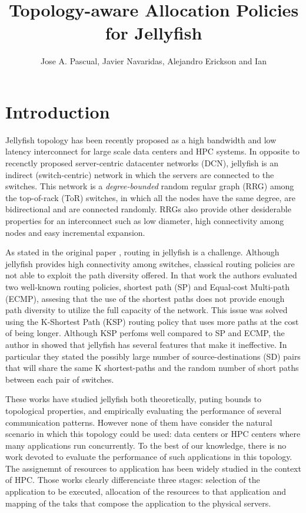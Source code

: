 \documentclass{sig-alternate}
\title{Topology-aware Allocation Policies for Jellyfish }
\author{Jose A. Pascual, Javier Navaridas, Alejandro Erickson and Ian }
\begin{document}
\maketitle
\thispagestyle{firstpage}
\pagestyle{plain}

\begin{abstract}



\end{abstract}

\section{Introduction}
\label{introduction}

Jellyfish topology \cite{jellyfish} has been recently proposed as a high bandwidth and low latency interconnect for large scale data centers and HPC systems. In opposite to recenctly proposed server-centric datacenter networks (DCN), jellyfish is an indirect (switch-centric) network in which the servers are connected to the switches. This network is a \textit{degree-bounded} random regular graph (RRG) among the top-of-rack (ToR) switches, in which all the nodes have the same degree, are bidirectional and are connected randomly. RRGs also provide other desiderable properties for an interconnect such as low diameter, high connectivity among nodes and easy incremental expansion.

As stated in the original paper \cite{jellyfish}, routing in jellyfish is a challenge. Although jellyfish provides high connectivity among switches, classical routing policies are not able to exploit the path diversity offered. In that work the authors evaluated two well-known routing policies, shortest path (SP) and Equal-cost Multi-path (ECMP), assesing that the use of the shortest paths does not provide enough path diversity to utilize the full capacity of the network. This issue was solved using the K-Shortest Path (KSP) \cite{yen} routing policy that uses more paths at the cost of being longer. Although KSP perfoms well compared to SP and ECMP, the author in \cite{llksp} showed that jellyfish has several features that make it ineffective. In particular they stated the possibly large number of source-destinations (SD) pairs that will share the same K shortest-paths and the random number of short paths between each pair of switches. 

These works have studied jellyfish both theoretically, puting bounds to topological properties, and empirically evaluating the performance of several communication patterns. However none of them have consider the natural scenario in which this topology could be used: data centers or HPC centers where many applications run concurrently. To the best of our knowledge, there is no work devoted to evaluate the performance of such applications in this topology. The assignemnt of resources to application has been widely studied in the context of HPC. Those works clearly differenciate three stages: selection of the application to be executed, allocation of the resources to that application and mapping of the taks that compose the application to the physical servers. 
\end{document}
